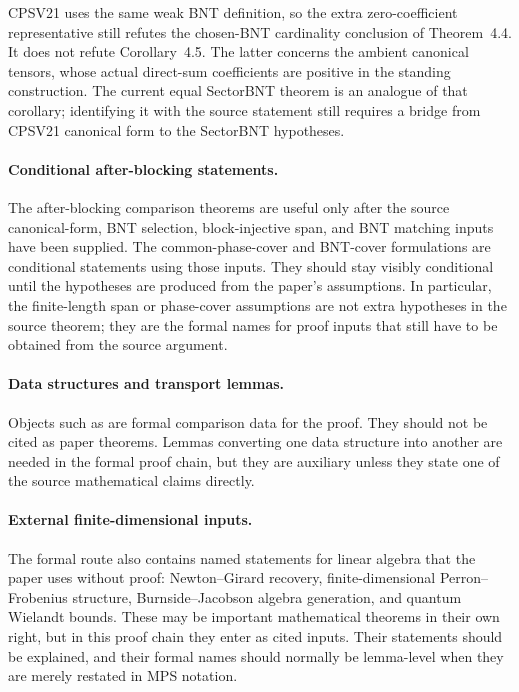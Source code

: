 \documentclass{article}
\begin{document}
CPSV21 uses the same weak BNT definition, so the extra zero-coefficient
representative still refutes the chosen-BNT cardinality conclusion of
Theorem~4.4.  It does not refute Corollary~4.5.  The latter concerns the ambient
canonical tensors, whose actual direct-sum coefficients are positive in the
standing construction.  The current equal SectorBNT theorem is an analogue of
that corollary; identifying it with the source statement still requires a bridge
from CPSV21 canonical form to the SectorBNT hypotheses.

\paragraph{Conditional after-blocking statements.}
The after-blocking comparison theorems are useful only after the source
canonical-form, BNT selection, block-injective span, and BNT matching inputs have
been supplied. The common-phase-cover and BNT-cover formulations are
conditional statements using those inputs. They should stay visibly conditional
until the hypotheses are produced from the paper's assumptions. In particular,
the finite-length span or phase-cover assumptions are not extra hypotheses in
the source theorem; they are the formal names for proof inputs that still have
to be obtained from the source argument.

\paragraph{Data structures and transport lemmas.}
Objects such as  are formal comparison
data for the proof. They should not be cited as paper theorems. Lemmas
converting one data structure into another are needed in the formal proof
chain, but they are auxiliary unless they state one of the source mathematical
claims directly.

\paragraph{External finite-dimensional inputs.}
The formal route also contains named statements for linear algebra that the
paper uses without proof: Newton--Girard recovery, finite-dimensional
Perron--Frobenius structure, Burnside--Jacobson algebra
generation, and quantum Wielandt bounds. These may be important mathematical
theorems in their own right, but in this proof chain they enter as cited inputs.
Their statements should be explained, and their formal names should normally be
lemma-level when they are merely restated in MPS notation.
\end{document}
